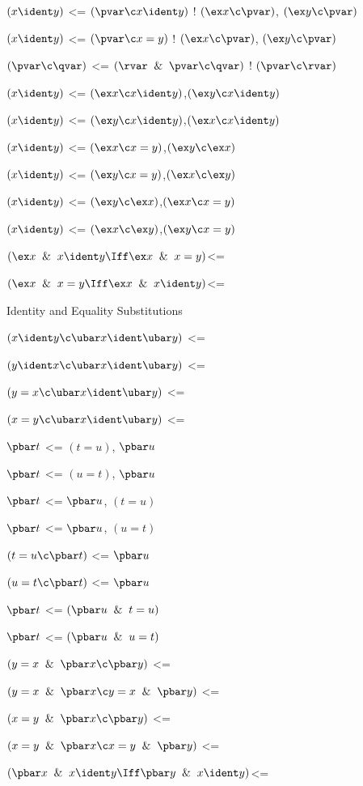 $(x \ident y)$ <=  $(\pvar \c x \ident y)$ ! $(\ex x \c \pvar)$, $(\ex y \c \pvar)$ 

$(x \ident y)$ <=  $(\pvar \c x  = y)$ ! $(\ex x \c \pvar)$, $(\ex y \c \pvar)$ 

$(\pvar \c \qvar)$ <= $(\rvar \And\pvar\c\qvar)$ ! $(\pvar \c \rvar)$ 

$(x \ident y)$ <= $(\ex x \c x \ident y)$,$(\ex y \c x \ident y)$

$(x \ident y)$ <= $(\ex y \c x \ident y)$,$(\ex x \c x \ident y)$

$(x \ident y)$ <= $(\ex x \c x = y)$,$(\ex y \c \ex x )$

$(x \ident y)$ <= $(\ex y \c x  = y)$,$(\ex x \c \ex y )$

$(x \ident y)$ <= $(\ex y \c \ex x )$,$(\ex x \c x = y)$

$(x \ident y)$ <= $(\ex x \c \ex y )$,$(\ex y \c x  = y)$

$(\ex x \And x \ident y \Iff \ex x \And x = y)$<=

$(\ex x \And x = y \Iff \ex x \And x \ident y)$<=


\lineb

Identity and Equality Substitutions
\lineb

$(x \ident y \c \ubar x \ident \ubar y)$ <= 

$(y \ident x \c \ubar x \ident \ubar y)$ <= 

$(y = x \c \ubar x \ident \ubar y)$ <=

$(x = y \c \ubar x \ident \ubar y)$ <=

$\pbar t$ <= $(t = u)$, $\pbar u$ 

$\pbar t$ <= $(u = t)$, $\pbar u$ 

$\pbar t$ <=  $\pbar u$, $(t = u)$

$\pbar t$ <=  $\pbar u$, $(u = t)$

$(t = u \c \pbar t)$ <= $\pbar u$ 

$(u = t \c \pbar t)$ <= $\pbar u$ 

$\pbar t$ <=  $(\pbar u \And t = u)$

$\pbar t$ <=  $(\pbar u \And u = t)$

$(y = x \And \pbar x \c \pbar y)$ <=

$(y = x \And \pbar x \c y = x \And \pbar y)$ <=

$(x = y \And \pbar x \c \pbar y)$ <=

$(x = y \And \pbar x \c x = y \And \pbar y)$ <=

$(\pbar x \And x \ident y \Iff \pbar y \And x \ident y)$<=

